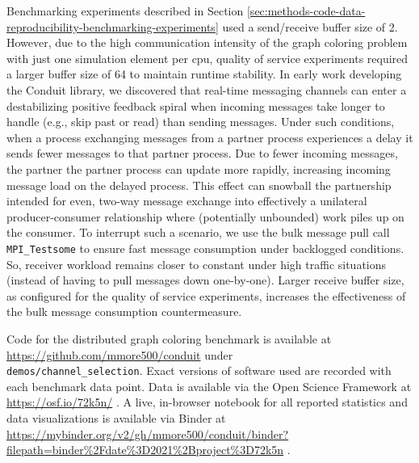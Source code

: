 Benchmarking experiments described in Section \ref{sec:methods-code-data-reproducibility-benchmarking-experiments} used a send/receive buffer size of 2.
However, due to the high communication intensity of the graph coloring problem with just one simulation element per cpu, quality of service experiments required a larger buffer size of 64 to maintain runtime stability.
In early work developing the Conduit library, we discovered that real-time messaging channels can enter a destabilizing positive feedback spiral when incoming messages take longer to handle (e.g., skip past or read) than sending messages.
Under such conditions, when a process exchanging messages from a partner process experiences a delay it sends fewer messages to that partner process.
Due to fewer incoming messages, the partner the partner process can update more rapidly, increasing incoming message load on the delayed process.
This effect can snowball the partnership intended for even, two-way message exchange into effectively a unilateral producer-consumer relationship where (potentially unbounded) work piles up on the consumer.
To interrupt such a scenario, we use the bulk message pull call \verb|MPI_Testsome| to ensure fast message consumption under backlogged conditions.
So, receiver workload remains closer to constant under high traffic situations (instead of having to pull messages down one-by-one).
Larger receive buffer size, as configured for the quality of service experiments, increases the effectiveness of the bulk message consumption countermeasure.

Code for the distributed graph coloring benchmark is available at \url{https://github.com/mmore500/conduit} under \\ \texttt{demos/channel\_selection}.
Exact versions of software used are recorded with each benchmark data point.
Data is available via the Open Science Framework at \url{https://osf.io/72k5n/} \citep{foster2017open}.
A live, in-browser notebook for all reported statistics and data visualizations is available via Binder at \url{https://mybinder.org/v2/gh/mmore500/conduit/binder?filepath=binder%2Fdate%3D2021%2Bproject%3D72k5n} \citep{jupyter2018binder}.
